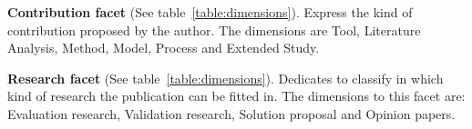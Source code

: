 \textbf{Contribution facet} (See table~\ref{table:dimensions}).
Express the kind of contribution proposed by the author. 
The dimensions are Tool, Literature Analysis, Method, Model, Process and Extended Study.

\textbf{Research facet} (See table~\ref{table:dimensions}).
Dedicates to classify in which kind of research the publication can be fitted in. 
The dimensions to this facet are: Evaluation research, Validation research, Solution proposal 
and Opinion papers.


